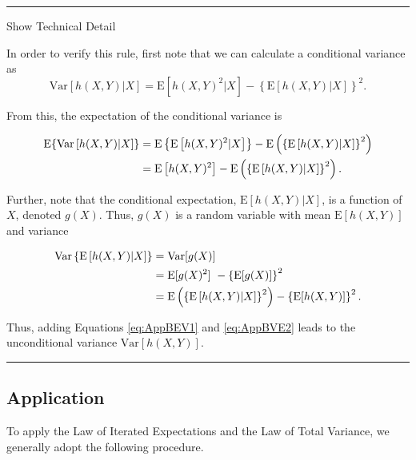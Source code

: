 \documentclass[]{book}
\theoremstyle{definition}
\theoremstyle{definition}
\theoremstyle{definition}
\theoremstyle{remark}
\begin{document}
\begin{center}\rule{0.5\linewidth}{\linethickness}\end{center}

Show Technical Detail

\hypertarget{EXM:S2a:LTV}{}
In order to verify this rule, first note that we can calculate a
conditional variance as
\[\mathrm{Var} \left[ h(X,Y) | X \right]  = \mathrm{E} [ h(X,Y)^2 | X ] -\left\{\mathrm{E} \left[ h(X,Y) | X \right] \right\}^2.\]

From this, the expectation of the conditional variance is

\begin{align}
    \mathrm{E}\{\mathrm{Var} \left[ h(X,Y) | X \right] \} &=
    \mathrm{E}\left\{\mathrm{E} \left[ h(X,Y)^2 | X \right] \right\} - \mathrm{E}\left(\left\{\mathrm{E} \left[ h(X,Y) | X \right] \right\}^2\right) \notag \\
    &=\mathrm{E} \left[ h(X,Y)^2\right] - \mathrm{E}\left(\left\{\mathrm{E} \left[ h(X,Y) | X \right] \right\}^2\right).\label{eq:AppBEV1}
\end{align}

Further, note that the conditional expectation,
\(\mathrm{E} \left[ h(X,Y) | X \right]\), is a function of \(X\),
denoted \(g(X)\). Thus, \(g(X)\) is a random variable with mean
\(\mathrm{E}[h(X,Y)]\) and variance

\begin{align}
    \mathrm{Var} \left\{ \mathrm{E} \left[ h(X,Y) | X \right] \right \} &=\mathrm{Var}[g(X)]  \notag \\
    &= \mathrm{E}[g(X)^2]\ - \left\{\mathrm{E}[g(X)]\right\}^2 \nonumber\\
    &= \mathrm{E}\left(\left\{\mathrm{E} \left[ h(X,Y) | X \right] \right\}^2\right)
    - \left\{\mathrm{E}[h(X,Y)]\right\}^2.\label{eq:AppBVE2}
\end{align}

Thus, adding Equations \eqref{eq:AppBEV1} and \eqref{eq:AppBVE2} leads to
the unconditional variance \(\mathrm{Var} \left[ h(X,Y) \right]\).

\begin{center}\rule{0.5\linewidth}{\linethickness}\end{center}

\subsection{Application}\label{application}

To apply the Law of Iterated Expectations and the Law of Total Variance,
we generally adopt the following procedure.
\end{document}
